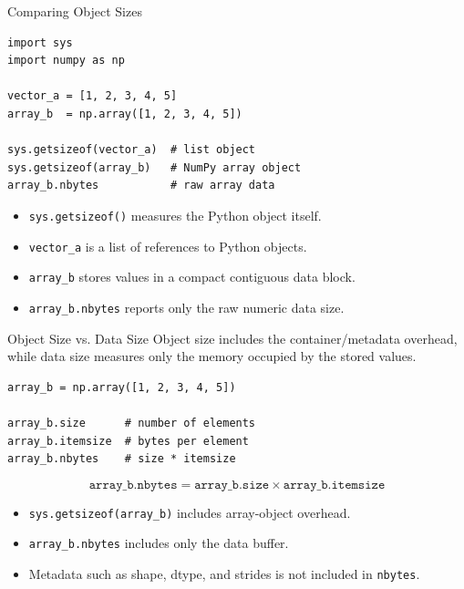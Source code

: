 \documentclass[11pt,aspectratio=43]{beamer}
\begin{document}
{

  \begin{frame}[fragile]{Comparing Object Sizes}
    \footnotesize
    \begin{lstlisting}
import sys
import numpy as np

vector_a = [1, 2, 3, 4, 5]
array_b  = np.array([1, 2, 3, 4, 5])

sys.getsizeof(vector_a)  # list object
sys.getsizeof(array_b)   # NumPy array object
array_b.nbytes           # raw array data
    \end{lstlisting}

    \begin{itemize}
      \small
      \item \texttt{sys.getsizeof()} measures the Python object itself.
      \item \texttt{vector\_a} is a list of references to Python objects.
      \item \texttt{array\_b} stores values in a compact contiguous data block.
      \item \texttt{array\_b.nbytes} reports only the raw numeric data size.
    \end{itemize}
  \end{frame}


  \begin{frame}[fragile]{Object Size vs. Data Size}
    \footnotesize
    Object size includes the container/metadata overhead,\\
    while data size measures only the memory occupied by the stored values.

    \begin{lstlisting}
array_b = np.array([1, 2, 3, 4, 5])

array_b.size      # number of elements
array_b.itemsize  # bytes per element
array_b.nbytes    # size * itemsize
    \end{lstlisting}

    \[
    \texttt{array\_b.nbytes}
    =
    \texttt{array\_b.size}
    \times
    \texttt{array\_b.itemsize}
    \]

    \begin{itemize}
      \small
      \item \texttt{sys.getsizeof(array\_b)} includes array-object overhead.
      \item \texttt{array\_b.nbytes} includes only the data buffer.
      \item Metadata such as shape, dtype, and strides is not included in \texttt{nbytes}.
    \end{itemize}
  \end{frame}

}
\end{document}
